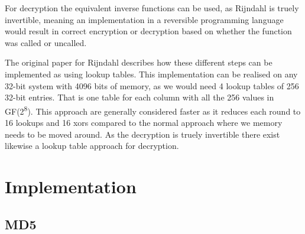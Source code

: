 \documentclass[a4paper]{article}
\begin{document}
For decryption the equivalent inverse functions can be used, as Rijndahl is truely invertible, meaning an implementation in a reversible programming language would result in correct encryption or decryption based on whether the function was called or uncalled.

The original paper for Rijndahl\cite{Rijndahl} describes how these different steps can be implemented as using lookup tables. This implementation can be realised on any 32-bit system with 4096 bits of memory, as we would need 4 lookup tables of 256 32-bit entries. That is one table for each column with all the 256 values in GF(2\textsuperscript{8}). This approach are generally considered faster as it reduces each round to 16 lookups and 16 xors compared to the normal approach where we memory needs to be moved around. As the decryption is truely invertible there exist likewise a lookup table approach for decryption.

\section{Implementation}
\label{sec:org64f1e50}
\subsection{MD5}
\label{sec:org82a4056}
\end{document}

